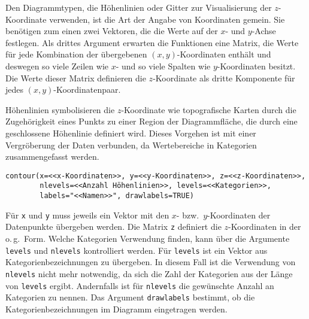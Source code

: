 Den Diagrammtypen, die Höhenlinien oder Gitter zur Visualisierung der $z$-Koordinate verwenden, ist die Art der Angabe von Koordinaten gemein. Sie benötigen zum einen zwei Vektoren, die die Werte auf der $x$- und $y$-Achse festlegen. Als drittes Argument erwarten die Funktionen eine Matrix, die Werte für jede Kombination der übergebenen $(x, y)$-Koordinaten enthält und deswegen so viele Zeilen wie $x$- und so viele Spalten wie $y$-Koordinaten besitzt. Die Werte dieser Matrix definieren die $z$-Koordinate als dritte Komponente für jedes $(x, y)$-Koordinatenpaar.

Höhenlinien symbolisieren die $z$-Koordinate wie topografische Karten durch die Zugehörigkeit eines Punkts zu einer Region der Diagrammfläche, die durch eine geschlossene Höhenlinie definiert wird. Dieses Vorgehen ist mit einer Vergröberung der Daten verbunden, da Wertebereiche in Kategorien zusammengefasst werden.
\begin{lstlisting}
contour(x=<<x-Koordinaten>>, y=<<y-Koordinaten>>, z=<<z-Koordinaten>>,
        nlevels=<<Anzahl Höhenlinien>>, levels=<<Kategorien>>,
        labels="<<Namen>>", drawlabels=TRUE)
\end{lstlisting}

Für \lstinline!x! und \lstinline!y! muss jeweils ein Vektor mit den $x$- bzw.\ $y$-Koordinaten der Datenpunkte übergeben werden. Die Matrix \lstinline!z! definiert die $z$-Koordinaten in der o.\,g.\ Form. Welche Kategorien Verwendung finden, kann über die Argumente \lstinline!levels! und \lstinline!nlevels! kontrolliert werden. Für \lstinline!levels! ist ein Vektor aus Kategorienbezeichnungen zu übergeben. In diesem Fall ist die Verwendung von \lstinline!nlevels! nicht mehr notwendig, da sich die Zahl der Kategorien aus der Länge von \lstinline!levels! ergibt. Andernfalls ist für \lstinline!nlevels! die gewünschte Anzahl an Kategorien zu nennen. Das Argument \lstinline!drawlabels! bestimmt, ob die Kategorienbezeichnungen im Diagramm eingetragen werden.

